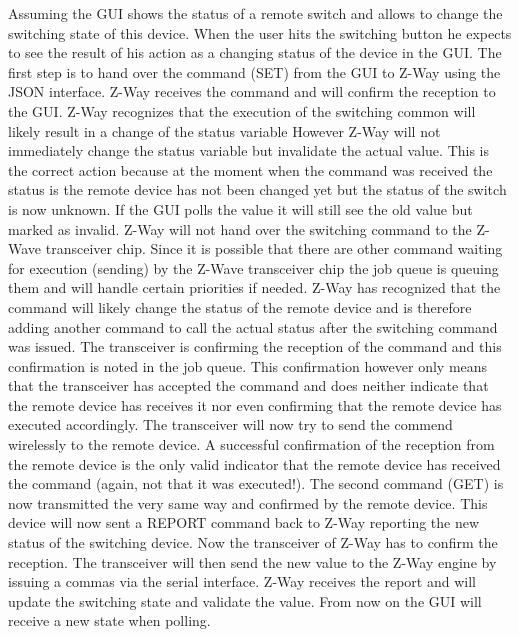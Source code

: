 Assuming the GUI shows the status of a remote switch and allows to change the switching 
state of this device. When the user hits the switching button he expects to 
see the result of his action as a changing status of the device in the GUI. The first 
step is to hand over the command (SET)  from the GUI to Z-Way using the JSON interface.
Z-Way receives the command and will confirm the reception to the GUI. Z-Way recognizes 
that the execution of the switching common will likely result in a change 
of the status variable However Z-Way will not immediately change the status variable but 
invalidate the actual value. This is the correct action because at the moment
when the command was received the status is the remote device has not been changed yet 
but the status of the switch is now unknown.
If the GUI polls the value it will still see the old value but marked as invalid.
Z-Way will not hand over the switching command to the Z-Wave transceiver chip. Since it 
is possible that there are other command waiting for execution (sending) by 
the Z-Wave transceiver chip the job queue is queuing them and will handle certain 
priorities if needed. Z-Way has recognized that the command will likely change the status
of the remote device and is therefore adding another command to call the actual status 
after the switching command was issued.
The transceiver is confirming the reception of the command and this confirmation is noted 
in the job queue. This confirmation however only means that the transceiver 
has accepted the command and does neither indicate that the remote device has receives 
it nor even confirming that the remote device has executed accordingly.
The transceiver will now try to send the commend wirelessly to the remote device. A 
successful confirmation of the reception from the remote device is the only valid 
indicator that the remote device has received the command (again, not that it was executed!).
The second command (GET) is now transmitted the very same way and confirmed by the remote 
device. This device will now sent a REPORT command back to Z-Way
reporting the new status of the switching device. Now the transceiver of Z-Way has to 
confirm the reception. The transceiver will then send the new value to the Z-Way 
engine by issuing a commas via the serial interface. Z-Way receives the report and will 
update the switching state and validate the value.
From now on the GUI will receive a new state when polling.
